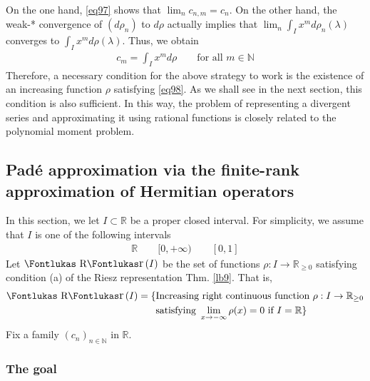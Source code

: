 \documentclass[12pt,b5paper,notitlepage]{article}
\theoremstyle{definition}
\theoremstyle{plain}
\DeclareMathOperator{\Rr}{\text{\Fontlukas R}\text{\kern -0pt {\Fontlukas\large r}}\,}
\newcommand{\Nbb}{\mathbb N}
\newcommand{\Rbb}{\mathbb R}
\numberwithin{equation}{section}
\begin{document}
On the one hand, \eqref{eq97} shows that $\lim_n c_{n,m}=c_n$. On the other hand, the weak-* convergence of $(d\rho_n)$ to $d\rho$ actually implies that $\lim_n\int_I x^m d\rho_n(\lambda)$ converges to $\int_I x^m d\rho(\lambda)$. Thus, we obtain
\begin{align}\label{eq98}
c_m=\int_I x^md\rho\qquad\text{for all }m\in\Nbb
\end{align}
Therefore, a necessary condition for the above strategy to work is the existence of an increasing function $\rho$ satisfying \eqref{eq98}. As we shall see in the next section, this condition is also sufficient. In this way, the problem of representing a divergent series and approximating it using rational functions is closely related to the polynomial moment problem.










\subsection{Pad\'e approximation via the finite-rank approximation of Hermitian operators}\label{lb188}



In this section, we let $I\subset\Rbb$ be a proper closed interval. For simplicity, we assume that $I$ is one of the following intervals
\begin{align*}
\Rbb\qquad [0,+\infty)\qquad [0,1]
\end{align*} 
Let $\Rr(I)$ \index{Rr@$\Rr(I)$} be the set of functions $\rho:I\rightarrow\Rbb_{\geq0}$ satisfying condition (a) of the Riesz representation Thm. \ref{lb9}. That is,
\begin{align}\label{eq100}
\begin{aligned}
\Rr(I)=\{&\text{Increasing right continuous function }\rho:I\rightarrow\Rbb_{\geq0}\\
&\text{satisfying }\lim_{x\rightarrow-\infty}\rho(x)=0\text{ if }I=\Rbb\}
\end{aligned}
\end{align}
Fix a family $(c_n)_{n\in\Nbb}$ in $\Rbb$. 

\subsubsection{The goal}
\end{document}
